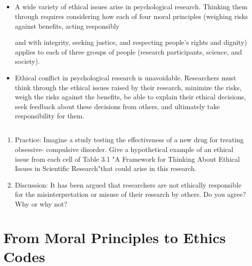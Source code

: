 \subsection{}
\begin{fullwidth}
\begin{itemize}
\item A wide variety of ethical issues arise in psychological research. Thinking them through requires considering how each of four moral principles (weighing risks against benefits, acting responsibly
  
and with integrity, seeking justice, and respecting people's rights and dignity) applies to each of three groups of people (research participants, science, and society).
\item Ethical conflict in psychological research is unavoidable. Researchers must think through the ethical issues raised by their research, minimize the risks, weigh the risks against the benefits, be able to explain their ethical decisions, seek feedback about these decisions from others, and ultimately take responsibility for them.
\end{itemize}
\end{fullwidth}

\subsection{}
\begin{fullwidth}
\begin{enumerate}
\item Practice: Imagine a study testing the effectiveness of a new drug for treating obsessive- compulsive disorder. Give a hypothetical example of an ethical issue from each cell of Table 3.1 "A Framework for Thinking About Ethical Issues in Scientific Research"that could arise in this research.
\item Discussion: It has been argued that researchers are not ethically responsible for the misinterpretation or misuse of their research by others. Do you agree? Why or why not?
\end{enumerate}
\end{fullwidth}  

\newpage
\section{From Moral Principles to Ethics Codes}


